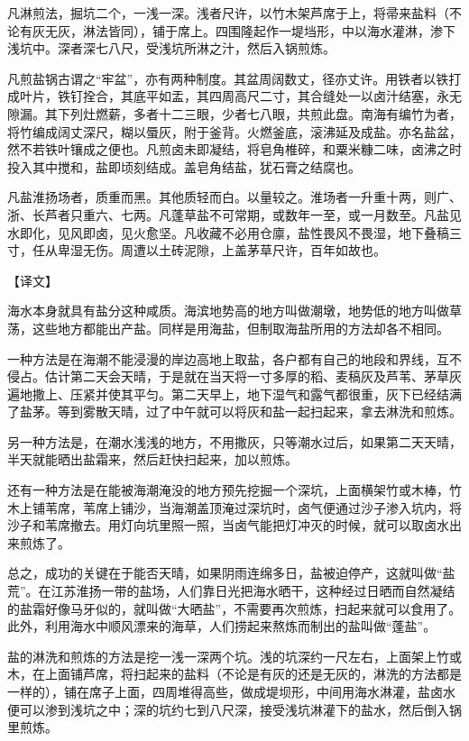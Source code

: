 \documentclass[12pt,UTF8]{ctexbook}
\begin{document}
凡淋煎法，掘坑二个，一浅一深。浅者尺许，以竹木架芦席于上，将帚来盐料（不论有灰无灰，淋法皆同），铺于席上。四围隆起作一堤垱形，中以海水灌淋，渗下浅坑中。深者深七八尺，受浅坑所淋之汁，然后入锅煎炼。

凡煎盐锅古谓之“牢盆”，亦有两种制度。其盆周阔数丈，径亦丈许。用铁者以铁打成叶片，铁钉拴合，其底平如盂，其四周高尺二寸，其合缝处一以卤汁结塞，永无隙漏。其下列灶燃薪，多者十二三眼，少者七八眼，共煎此盘。南海有编竹为者，将竹编成阔丈深尺，糊以蜃灰，附于釜背。火燃釜底，滚沸延及成盐。亦名盐盆，然不若铁叶镶成之便也。凡煎卤未即凝结，将皂角椎碎，和粟米糠二味，卤沸之时投入其中搅和，盐即顷刻结成。盖皂角结盐，犹石膏之结腐也。

凡盐淮扬场者，质重而黑。其他质轻而白。以量较之。淮场者一升重十两，则广、浙、长芦者只重六、七两。凡蓬草盐不可常期，或数年一至，或一月数至。凡盐见水即化，见风即卤，见火愈坚。凡收藏不必用仓廪，盐性畏风不畏湿，地下叠稿三寸，任从卑湿无伤。周遭以土砖泥隙，上盖茅草尺许，百年如故也。

【译文】

海水本身就具有盐分这种咸质。海滨地势高的地方叫做潮墩，地势低的地方叫做草荡，这些地方都能出产盐。同样是用海盐，但制取海盐所用的方法却各不相同。

一种方法是在海潮不能浸漫的岸边高地上取盐，各户都有自己的地段和界线，互不侵占。估计第二天会天晴，于是就在当天将一寸多厚的稻、麦稿灰及芦苇、茅草灰遍地撒上、压紧并使其平匀。第二天早上，地下湿气和露气都很重，灰下已经结满了盐茅。等到雾散天晴，过了中午就可以将灰和盐一起扫起来，拿去淋洗和煎炼。

另一种方法是，在潮水浅浅的地方，不用撒灰，只等潮水过后，如果第二天天晴，半天就能晒出盐霜来，然后赶快扫起来，加以煎炼。

还有一种方法是在能被海潮淹没的地方预先挖掘一个深坑，上面横架竹或木棒，竹木上铺苇席，苇席上铺沙，当海潮盖顶淹过深坑时，卤气便通过沙子渗入坑内，将沙子和苇席撤去。用灯向坑里照一照，当卤气能把灯冲灭的时候，就可以取卤水出来煎炼了。

总之，成功的关键在于能否天晴，如果阴雨连绵多日，盐被迫停产，这就叫做“盐荒”。在江苏淮扬一带的盐场，人们靠日光把海水晒干，这种经过日晒而自然凝结的盐霜好像马牙似的，就叫做“大晒盐”，不需要再次煎炼，扫起来就可以食用了。此外，利用海水中顺风漂来的海草，人们捞起来熬炼而制出的盐叫做“蓬盐”。

盐的淋洗和煎炼的方法是挖一浅一深两个坑。浅的坑深约一尺左右，上面架上竹或木，在上面铺芦席，将扫起来的盐料（不论是有灰的还是无灰的，淋洗的方法都是一样的），铺在席子上面，四周堆得高些，做成堤坝形，中间用海水淋灌，盐卤水便可以渗到浅坑之中；深的坑约七到八尺深，接受浅坑淋灌下的盐水，然后倒入锅里煎炼。
\end{document}
